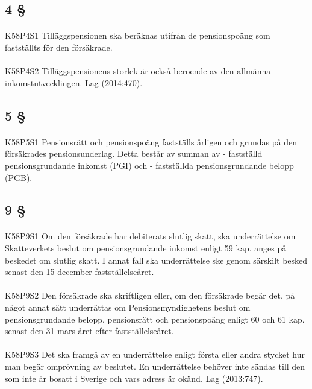 \documentclass[a4paper,notitlepage,openany,10pt]{book}
\begin{document}
\subsection*{4 §}
\paragraph*{}
{\tiny K58P4S1}
Tilläggspensionen ska beräknas utifrån de pensionspoäng som fastställts för den försäkrade.
\paragraph*{}
{\tiny K58P4S2}
Tilläggspensionens storlek är också beroende av den allmänna inkomstutvecklingen.
Lag (2014:470).
\subsection*{5 §}
\paragraph*{}
{\tiny K58P5S1}
Pensionsrätt och pensionspoäng fastställs årligen och grundas på den försäkrades pensionsunderlag. Detta består av summan av
\newline - fastställd pensionsgrundande inkomst (PGI) och
\newline - fastställda pensionsgrundande belopp (PGB).
\subsection*{9 §}
\paragraph*{}
{\tiny K58P9S1}
Om den försäkrade har debiterats slutlig skatt, ska underrättelse om Skatteverkets beslut om pensionsgrundande inkomst enligt 59 kap. anges på beskedet om slutlig skatt. I annat fall ska underrättelse ske genom särskilt besked senast den 15 december fastställelseåret.
\paragraph*{}
{\tiny K58P9S2}
Den försäkrade ska skriftligen eller, om den försäkrade begär det, på något annat sätt underrättas om Pensionsmyndighetens beslut om pensionsgrundande belopp, pensionsrätt och pensionspoäng enligt 60 och 61 kap. senast den 31 mars året efter fastställelseåret.
\paragraph*{}
{\tiny K58P9S3}
Det ska framgå av en underrättelse enligt första eller andra stycket hur man begär omprövning av beslutet. En underrättelse behöver inte sändas till den som inte är bosatt i Sverige och vars adress är okänd.
Lag (2013:747).
\end{document}
